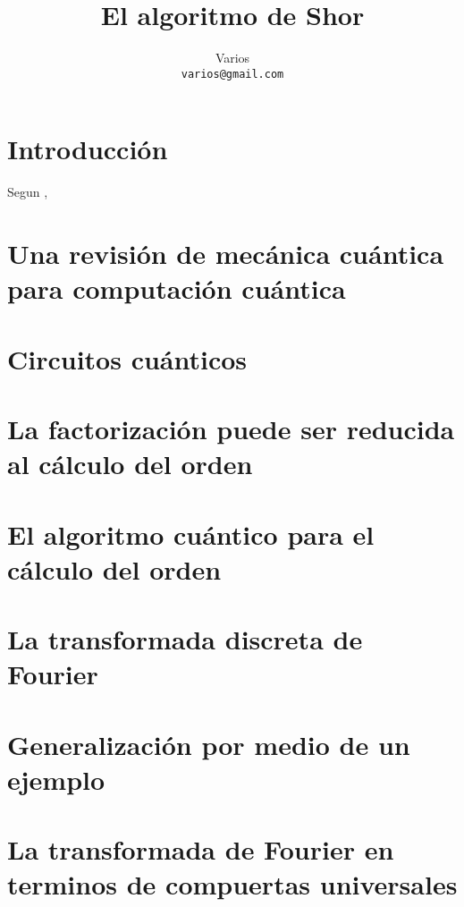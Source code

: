 \documentclass[12pt]{article}
\title{El algoritmo de Shor}
\author{Varios\\ {\tt varios@gmail.com}}
\date{}
\theoremstyle{definition}
\begin{document}
\maketitle

\section{Introducción}
Segun \citet{Shor:1994},
\section{Una revisión de mecánica cuántica para computación cuántica}
\section{Circuitos cuánticos}
\section{La factorización puede ser reducida al cálculo del orden}
\section{El algoritmo cuántico para el cálculo del orden}
\section{La transformada discreta de Fourier}
\section{Generalización por medio de un ejemplo}
\section{La transformada de Fourier en terminos de compuertas universales}



\end{document}
